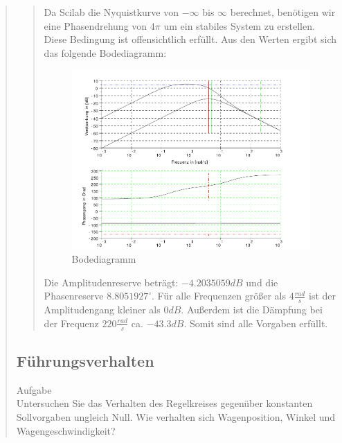 \begin{quote}
\begin{quote}
        Da Scilab die Nyquistkurve von $-\infty$ bis $\infty$ berechnet, benötigen wir eine Phasendrehung von $4\pi$ um ein
        stabiles System zu erstellen. Diese Bedingung ist offensichtlich erfüllt.\vspace{1em}
        Aus den Werten ergibt sich das folgende Bodediagramm:
        
        \begin{figure}[H]
        \centering
            \includegraphics[scale=0.7, trim = 0cm 0cm 0cm 0cm, clip]{./Bilder/Bodediagramm}
                \caption{Bodediagramm}
        \end{figure}
        
        Die Amplitudenreserve beträgt: $-4.2035059 dB$ und die Phasenreserve $8.8051927 ^{\circ}$. Für alle Frequenzen
        größer als $4\frac{rad}{s}$ ist der Amplitudengang kleiner als $0dB$. Außerdem ist die Dämpfung bei der Frequenz
        $220 \frac{rad}{s}$ ca. $-43.3 dB$. Somit sind alle Vorgaben erfüllt. 
    
    \end{quote}  %
    
    \subsection{Führungsverhalten}
    Aufgabe\\
    Untersuchen Sie das Verhalten des Regelkreises gegenüber konstanten Sollvorgaben ungleich Null. Wie verhalten sich
    Wagenposition, Winkel und Wagengeschwindigkeit?
    

\end{quote}
